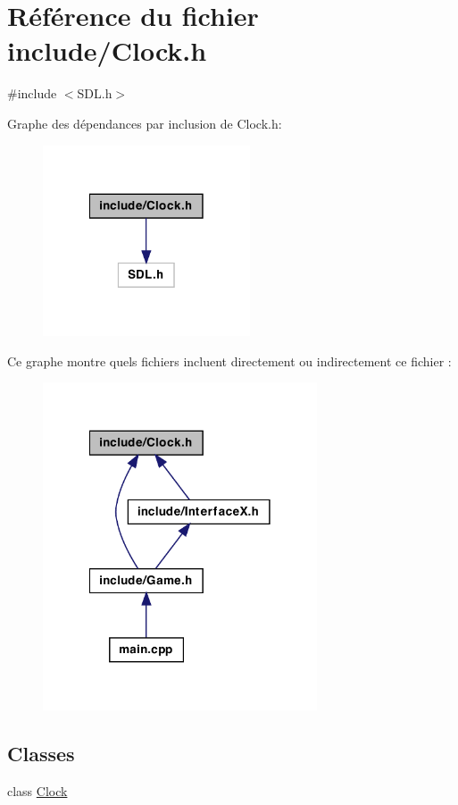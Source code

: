 \hypertarget{a00018}{
\section{Référence du fichier include/Clock.h}
\label{a00018}
}
{\ttfamily \#include $<$SDL.h$>$}\par
Graphe des dépendances par inclusion de Clock.h:
\nopagebreak
\begin{figure}[H]
\begin{center}
\leavevmode
\includegraphics[width=174pt]{a00042}
\end{center}
\end{figure}
Ce graphe montre quels fichiers incluent directement ou indirectement ce fichier :
\nopagebreak
\begin{figure}[H]
\begin{center}
\leavevmode
\includegraphics[width=230pt]{a00043}
\end{center}
\end{figure}
\subsection*{Classes}
\begin{DoxyCompactItemize}
\item 
class \hyperlink{a00003}{Clock}
\end{DoxyCompactItemize}
